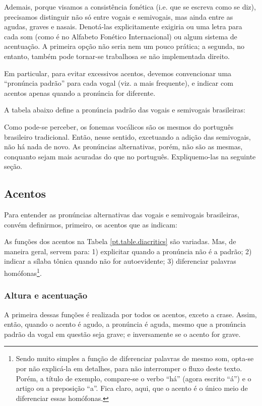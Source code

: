 \documentclass[12pt, a5paper, titlepage]{article}
\begin{document}
Ademais, porque visamos a consistência fonética (i.e. que se escreva como se
diz), precisamos distinguir não só entre vogais e semivogais, mas ainda entre
as agudas, graves e nasais. Denotá-las explicitamente exigiria ou uma letra
para cada som (como é no Alfabeto Fonético Internacional) ou algum sistema de
acentuação. A primeira opção não seria nem um pouco prática; a segunda, no
entanto, também pode tornar-se trabalhosa se não implementada direito.

Em particular, para evitar excessivos acentos, devemos convencionar uma
``pronúncia padrão'' para cada vogal (viz. a mais frequente), e indicar com
acentos apenas quando a pronúncia for diferente.

A tabela abaixo define a pronúncia padrão das vogais e semivogais brasileiras:

\PtTableVowels

Como pode-se perceber, os fonemas vocálicos são os mesmos do português
brasileiro tradicional. Então, nesse sentido, excetuando a adição das semivogais, não há
nada de novo. As pronúncias alternativas, porém, não são as mesmas, conquanto
sejam mais acuradas do que no português. Expliquemo-las na seguinte seção.

\subsection{Acentos}
Para entender as pronúncias alternativas das vogais e semivogais brasileiras,
convém definirmos, primeiro, os acentos que as indicam:

\PtTableDiacritics

As funções dos acentos na Tabela \ref{pt.table.diacritics} são variadas. Mas,
de maneira geral, servem para: 1) explicitar quando a pronúncia não é a padrão;
2) indicar a sílaba tônica quando não for autoevidente; 3) diferenciar palavras
homófonas\footnote{Sendo muito simples a função de diferenciar palavras de mesmo som, opta-se por não explicá-la em detalhes, para não interromper o fluxo deste texto. Porém, a título de exemplo, compare-se o verbo ``há'' (agora escrito ``á'') e o artigo ou a preposição ``a''. Fica claro, aqui, que o acento é o único meio de diferenciar essas homófonas.}.

\subsubsection{Altura e acentuação}
A primeira dessas funções é realizada por todos os acentos, exceto a crase.
Assim, então, quando o acento é agudo, a pronúncia é aguda, mesmo que a
pronúncia padrão da vogal em questão seja grave; e inversamente se o acento for
grave.
\end{document}
